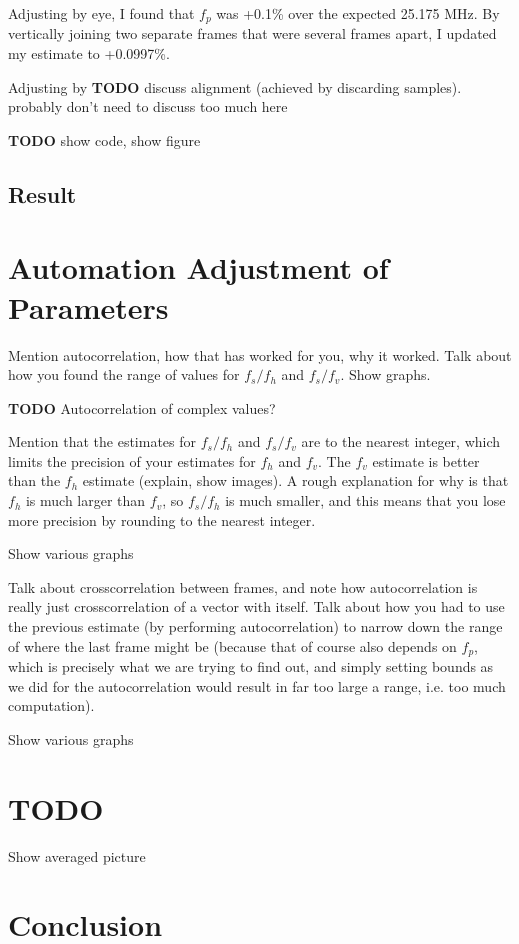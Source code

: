 \documentclass{article}
\newcommand*{\TODO}{\textbf{TODO}\xspace}
\begin{document}
Adjusting by eye, I found that $f_p$ was +0.1\% over the expected 25.175 MHz. By vertically joining two separate frames that were several frames apart, I updated my estimate to +0.0997\%.

Adjusting by \TODO discuss alignment (achieved by discarding samples). probably don't need to discuss too much here

\textbf{TODO} show code, show figure

\subsection*{Result}

\section*{Automation Adjustment of Parameters}

Mention autocorrelation, how that has worked for you, why it worked.
Talk about how you found the range of values for $f_s / f_h$ and $f_s / f_v$. Show graphs.

\textbf{TODO} Autocorrelation of complex values?

Mention that the estimates for $f_s / f_h$ and $f_s / f_v$ are to the nearest integer, which limits the precision of your estimates for $f_h$ and $f_v$. The $f_v$ estimate is better than the $f_h$ estimate (explain, show images). A rough explanation for why is that $f_h$ is much larger than $f_v$, so $f_s / f_h$ is much smaller, and this means that you lose more precision by rounding to the nearest integer.

Show various graphs

Talk about crosscorrelation between frames, and note how autocorrelation is really just crosscorrelation of a vector with itself. Talk about how you had to use the previous estimate (by performing autocorrelation) to narrow down the range of where the last frame might be (because that of course also depends on $f_p$, which is precisely what we are trying to find out, and simply setting bounds as we did for the autocorrelation would result in far too large a range, i.e. too much computation).

Show various graphs

\section*{TODO}

Show averaged picture

\section*{Conclusion}

\newpage
\appendix

\newpage


\end{document}
